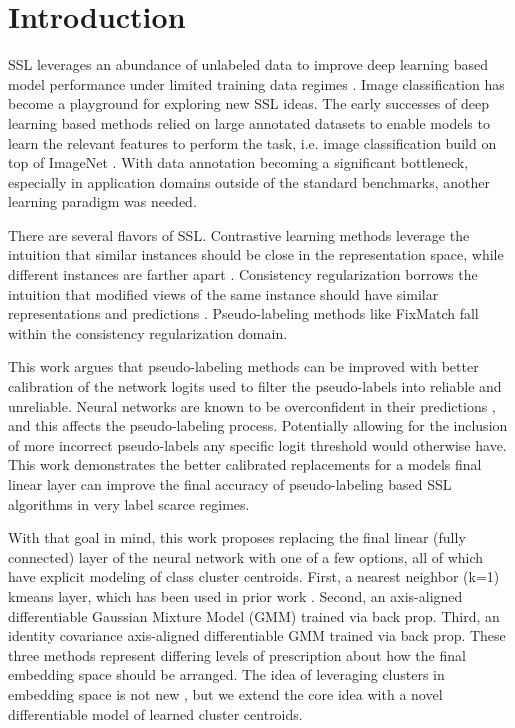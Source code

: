 \documentclass[10pt,twocolumn,letterpaper]{article}
\begin{document}
\section{Introduction}
SSL leverages an abundance of unlabeled data to improve deep learning based model performance under limited training data regimes \cite{zhu2022introduction,li2019safe,hady2013semi}.
Image classification has become a playground for exploring new SSL ideas.
The early successes of deep learning based methods relied on large annotated datasets to enable models to learn the relevant features to perform the task, i.e. image classification build on top of ImageNet \cite{deng2009imagenet}.
With data annotation becoming a significant bottleneck, especially in application domains outside of the standard benchmarks, another learning paradigm was needed.

There are several flavors of SSL.
Contrastive learning methods leverage the intuition that similar instances should be close in the representation space, while different instances are farther apart \cite{yang2022class,li2021comatch}.
Consistency regularization borrows the intuition that modified views of the same instance should have similar representations and predictions \cite{sohn2020fixmatch,lee2022contrastive,zhang2021flexmatch,kim2022conmatch}.
Pseudo-labeling methods like FixMatch \cite{sohn2020fixmatch} fall within the consistency regularization domain.

This work argues that pseudo-labeling methods can be improved with better calibration of the network logits used to filter the pseudo-labels into reliable and unreliable. 
Neural networks are known to be overconfident in their predictions \cite{wei2022mitigating}, and this affects the pseudo-labeling process. 
Potentially allowing for the inclusion of more incorrect pseudo-labels any specific logit threshold would otherwise have.
This work demonstrates the better calibrated replacements for a models final linear layer can improve the final accuracy of pseudo-labeling based SSL algorithms in very label scarce regimes. 

With that goal in mind, this work proposes replacing the final linear (fully connected) layer of the neural network with one of a few options, all of which have explicit modeling of class cluster centroids.
First, a nearest neighbor (k=1) kmeans layer, which has been used in prior work \cite{dwibedi2021little}.
Second, an axis-aligned  differentiable Gaussian Mixture Model (GMM) trained via back prop.
Third, an identity covariance axis-aligned differentiable GMM trained via back prop. 
These three methods represent differing levels of prescription about how the final embedding space should be arranged.
The idea of leveraging clusters in embedding space is not new \cite{caron2018deep,caron2020unsupervised}, but we extend the core idea with a novel differentiable model of learned cluster centroids. 
\end{document}
